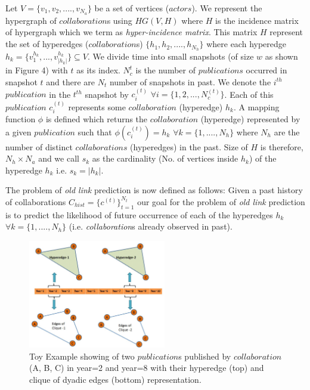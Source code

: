 \documentclass[twoside,leqno,twocolumn]{article}
\begin{document}
Let $V = \{v_1,v_2,....,v_{N_a}\}$ be a set of vertices ($actors$). We represent the hypergraph of $collaboration$s using $HG(V,H)$ where $H$ is the incidence matrix of hypergraph which we term as \textit{hyper-incidence matrix}. This matrix \(H\) represent the set of hyperedges ($collaboration$s) $\{h_1,h_2,....,h_{N_h}\}$ where each hyperedge $h_{k} = \{ v_{1}^{h_k},..., v_{|h_k|}^{h_k} \} \subseteq V$. We divide time into small snapshots (of size $w$ as shown in Figure 4) with $t$ as its index. $N_{c}^{t}$ is the number of $publications$ occurred in snapshot $t$ and there are $N_t$ number of snapshots in past. We denote the $i^{th}$ $publication$ in the $t^{th}$ snapshot by \(c_{i}^{(t)}\) \(\forall i = \{1,2,...,N_{c}^{(t)}\}\). Each of this $publication$ $c_i^{(t)}$ represents some $collaboration$ (hyperedge) $h_k$. A mapping function $\phi$ is defined which returns the $collaboration$ (hyperedge) represented by a given $publication$ such that $\phi(c_i^{(t)})=h_k $ $\forall k=\{1,....,N_h\}$ where $N_h$ are the number of distinct $collaborations$ (hyperedges) in the past. Size of $H$ is therefore, $N_h \times N_a$ and we call $s_k$ as the cardinality (No. of vertices inside $h_k$) of the hyperedge $h_k$ i.e. $s_k = |h_k|$.

The problem of \textit{old link} prediction is now defined as follows: Given a past history of collaborations $C_{hist}=\{c^{(t)}\}_{t=1}^{N_t}$ our goal for the problem of \textit{old link} prediction is to predict the likelihood of future occurrence of each of the hyperedges $h_k$ $\forall k=\{1,....,N_h\}$ (i.e. \textit{collaboration}s already observed in past).

\begin{figure}[h!]
\centering
\includegraphics[width=60mm]{intuition.JPG}
\caption{Toy Example showing of two $publication$s published by $collaboration$ (A, B, C) in year=2 and year=8 with their hyperedge (top) and clique of dyadic edges (bottom) representation.}
\label{overflow}
\vspace{-1.7em}
\end{figure}
\end{document}
